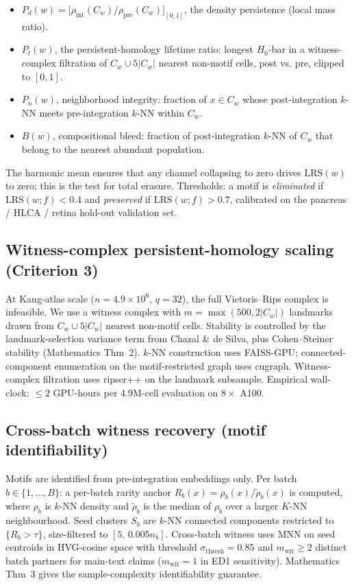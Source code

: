 \begin{itemize}
  \item $P_d(w) = \bigl[\rho_{\mathrm{int}}(C_w) / \rho_{\mathrm{pre}}(C_w)\bigr]_{[0,1]}$,
        the density persistence (local mass ratio).
  \item $P_t(w)$, the persistent-homology lifetime ratio: longest
        $H_0$-bar in a witness-complex filtration of $C_w \cup 5\lvert C_w\rvert$
        nearest non-motif cells, post vs. pre, clipped to $[0,1]$.
  \item $P_n(w)$, neighborhood integrity: fraction of $x \in C_w$ whose
        post-integration $k$-NN meets pre-integration $k$-NN within $C_w$.
  \item $B(w)$, compositional bleed: fraction of post-integration $k$-NN of
        $C_w$ that belong to the nearest abundant population.
\end{itemize}

The harmonic mean ensures that any channel collapsing to zero drives $\mathrm{LRS}(w)$
to zero; this is the test for total erasure. Thresholds: a motif is
\emph{eliminated} if $\mathrm{LRS}(w;f) < 0.4$ and \emph{preserved} if
$\mathrm{LRS}(w;f) > 0.7$, calibrated on the pancreas / HLCA / retina
hold-out validation set.

\subsection{Witness-complex persistent-homology scaling (Criterion 3)}
\label{sec:methods-scale}

At Kang-atlas scale ($n = 4.9 \times 10^6$, $q = 32$), the full Vietoris--Rips
complex is infeasible. We use a witness complex with
$m = \max(500, 2\lvert C_w\rvert)$ landmarks drawn from $C_w \cup 5\lvert C_w \rvert$
nearest non-motif cells. Stability is controlled by the landmark-selection
variance term from Chazal \& de Silva, plus Cohen--Steiner stability
(Mathematics Thm~2). $k$-NN construction uses FAISS-GPU; connected-component
enumeration on the motif-restricted graph uses cugraph. Witness-complex
filtration uses ripser++ on the landmark subsample. Empirical wall-clock:
$\le 2$ GPU-hours per 4.9M-cell evaluation on $8 \times$ A100.

\subsection{Cross-batch witness recovery (motif identifiability)}
\label{sec:methods-witness}

Motifs are identified from pre-integration embeddings only. Per batch
$b \in \{1, \ldots, B\}$: a per-batch rarity anchor
$R_b(x) = \rho_b(x) / \widetilde{\rho}_b(x)$ is computed, where $\rho_b$ is
$k$-NN density and $\widetilde{\rho}_b$ is the median of $\rho_b$ over a
larger $K$-NN neighbourhood. Seed clusters $S_b$ are $k$-NN connected
components restricted to $\{R_b > \tau\}$, size-filtered to
$[5,\,0.005 n_b]$. Cross-batch witness uses MNN on seed centroids in
HVG-cosine space with threshold $\sigma_{\mathrm{thresh}} = 0.85$ and
$m_{\mathrm{wit}} \ge 2$ distinct batch partners for main-text claims
($m_{\mathrm{wit}} = 1$ in ED1 sensitivity). Mathematics Thm~3 gives the
sample-complexity identifiability guarantee.

